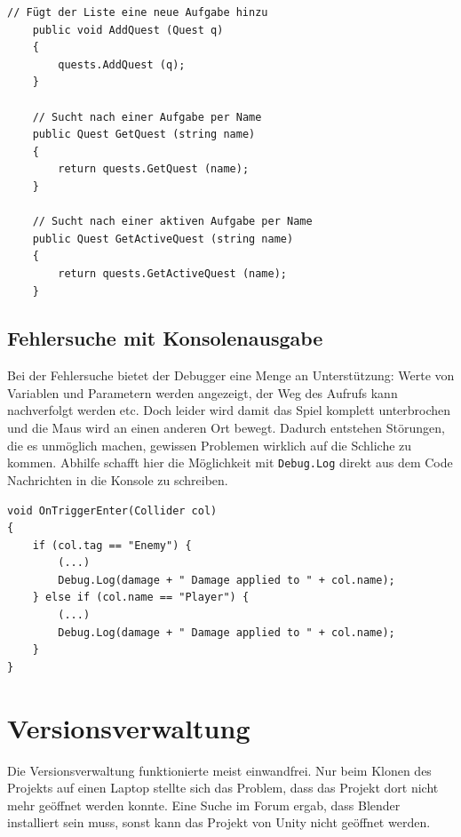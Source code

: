 \begin{lstlisting}[caption={Schnittstelle für Aufgaben in der Klasse Player}]
	// Fügt der Liste eine neue Aufgabe hinzu
	public void AddQuest (Quest q)
	{
		quests.AddQuest (q);
	}

	// Sucht nach einer Aufgabe per Name
	public Quest GetQuest (string name)
	{
		return quests.GetQuest (name);
	}

	// Sucht nach einer aktiven Aufgabe per Name
	public Quest GetActiveQuest (string name)
	{
		return quests.GetActiveQuest (name);
	}
\end{lstlisting}

\subsection{Fehlersuche mit Konsolenausgabe}

Bei der Fehlersuche bietet der Debugger eine Menge an Unterstützung: Werte von Variablen und Parametern werden angezeigt, der Weg des Aufrufs kann nachverfolgt werden etc. Doch leider wird damit das Spiel komplett unterbrochen und die Maus wird an einen anderen Ort bewegt. Dadurch entstehen Störungen, die es unmöglich machen, gewissen Problemen wirklich auf die Schliche zu kommen. Abhilfe schafft hier die Möglichkeit mit \lstinline{Debug.Log} direkt aus dem Code Nachrichten in die Konsole zu schreiben.

\begin{lstlisting}[caption={Konsoleausgaben beim Waffeneinsatz}]
void OnTriggerEnter(Collider col)
{
	if (col.tag == "Enemy") {
		(...)
		Debug.Log(damage + " Damage applied to " + col.name);
	} else if (col.name == "Player") {
		(...)
		Debug.Log(damage + " Damage applied to " + col.name);
	}
}
\end{lstlisting}





\newpage
\section{Versionsverwaltung}

Die Versionsverwaltung funktionierte meist einwandfrei. Nur beim Klonen des Projekts auf einen Laptop stellte sich das Problem, dass das Projekt dort nicht mehr geöffnet werden konnte. Eine Suche im Forum ergab, dass Blender installiert sein muss, sonst kann das Projekt von Unity nicht geöffnet werden.

